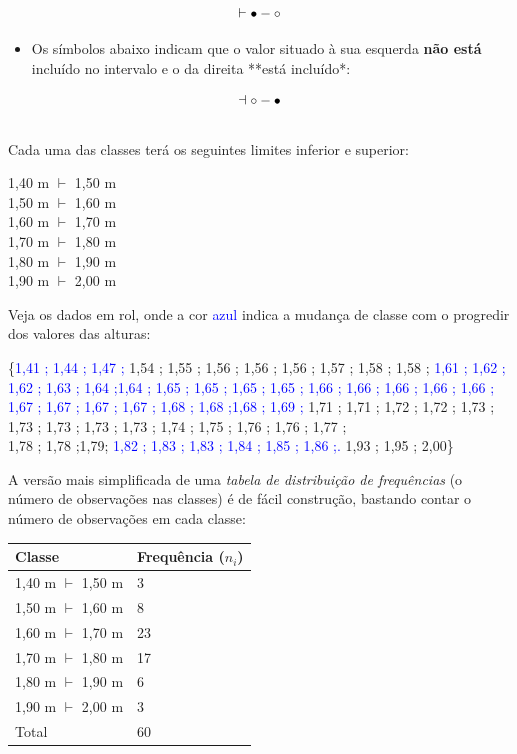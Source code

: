 \documentclass[
]{book}
\providecommand{\tightlist}{%
  \setlength{\itemsep}{0pt}\setlength{\parskip}{0pt}}
\begin{document}
~

\[
\vdash \\
{\bullet}-{\circ}
\]

\hfill\break

\begin{itemize}
\tightlist
\item
  Os símbolos abaixo indicam que o valor situado à sua esquerda \textbf{não está} incluído no intervalo e o da direita **está incluído*:
\end{itemize}

\hfill\break

\[
\dashv  \\
{\circ}-{\bullet}
\]\\

Cada uma das classes terá os seguintes limites inferior e superior:

\hfill\break

1,40 m \(\vdash\) 1,50 m\\
1,50 m \(\vdash\) 1,60 m\\
1,60 m \(\vdash\) 1,70 m\\
1,70 m \(\vdash\) 1,80 m\\
1,80 m \(\vdash\) 1,90 m\\
1,90 m \(\vdash\) 2,00 m

\hfill\break

Veja os dados em rol, onde a cor \textcolor{blue}{azul} indica a mudança de classe com o progredir dos valores das alturas:

\hfill\break

\{\textcolor{blue}{1,41 ; 1,44 ; 1,47 ;}
1,54 ; 1,55 ; 1,56 ; 1,56 ; 1,56 ; 1,57 ; 1,58 ; 1,58 ;
\textcolor{blue}{1,61 ; 1,62 ; 1,62 ; 1,63 ; 1,64 ;1,64 ; 1,65 ; 1,65 ; 1,65 ; 1,65 ; 1,66 ; 1,66 ; 1,66 ; 1,66 ; 1,66 ; 1,67 ; 1,67 ; 1,67 ; 1,67 ; 1,68 ; 1,68 ;1,68 ; 1,69 ;}
1,71 ; 1,71 ; 1,72 ; 1,72 ; 1,73 ; 1,73 ; 1,73 ; 1,73 ; 1,73 ; 1,74 ; 1,75 ; 1,76 ; 1,76 ; 1,77 ;\\
1,78 ; 1,78 ;1,79;
\textcolor{blue}{1,82 ; 1,83 ; 1,83 ; 1,84 ; 1,85 ; 1,86 ;.} 1,93 ; 1,95 ; 2,00\}

\hfill\break

A versão mais simplificada de uma \emph{tabela de distribuição de frequências} (o número de observações nas classes) é de fácil construção, bastando contar o número de observações em cada classe:

\hfill\break

\begin{longtable}[]{@{}ll@{}}
\toprule()
Classe & Frequência (\(n_{i}\)) \\
\midrule()
\endhead
1,40 m \(\vdash\) 1,50 m & 3 \\
1,50 m \(\vdash\) 1,60 m & 8 \\
1,60 m \(\vdash\) 1,70 m & 23 \\
1,70 m \(\vdash\) 1,80 m & 17 \\
1,80 m \(\vdash\) 1,90 m & 6 \\
1,90 m \(\vdash\) 2,00 m & 3 \\
Total & 60 \\
\bottomrule()
\end{longtable}
\end{document}
